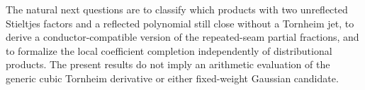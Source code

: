 The natural next questions are to classify which products with two
unreflected Stieltjes factors and a reflected polynomial still close
without a Tornheim jet, to derive a conductor-compatible version of the
repeated-seam partial fractions, and to formalize the local coefficient
completion independently of distributional products. The present
results do not imply an arithmetic evaluation of the generic cubic
Tornheim derivative or either fixed-weight Gaussian candidate.
